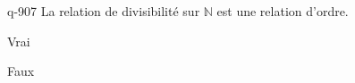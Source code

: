 \begin{truefalse}{q-907}
La relation de divisibilité sur $\mathbb N$ est une relation d'ordre.
\item* Vrai
\item Faux
\end{truefalse}

